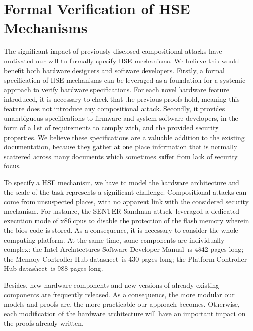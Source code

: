 \section{Formal Verification of HSE Mechanisms}
\label{sec:intro:verif}

The significant impact of previously disclosed compositional attacks have
motivated our will to formally specify HSE mechanisms.
%
We believe this would benefit both hardware designers and software developers.
%
Firstly, a formal specification of HSE mechanisms can be leveraged as a
foundation for a systemic approach to verify hardware specifications.
%
For each novel hardware feature introduced, it is necessary to check that the
previous proofs hold, meaning this feature does not introduce any compositional
attack.
%
Secondly, it provides unambiguous specifications to firmware and system software
developers, in the form of a list of requirements to comply with, and the
provided security properties.
%
We believe these specifications are a valuable addition to the existing
documentation, because they gather at one place information that is normally
scattered across many documents which sometimes suffer from lack of security
focus.

To specify a HSE mechanism, we have to model the hardware architecture and the
scale of the task represents a significant challenge.
%
Compositional attacks can come from unsuspected places, with no apparent link
with the considered security mechanism.
%
For instance, the SENTER Sandman attack\,\cite{kovah2015senter} leveraged a
dedicated execution mode of x86 \acp{cpu} to disable the protection of the flash
memory wherein the \ac{bios} code is stored.
%
As a consequence, it is necessary to consider the whole computing platform.
%
At the same time, some components are individually complex:
%
the Intel Architectures Software Developer Manual\,\cite{intel2014manual} is
4842 pages long;
%
the Memory Controller Hub datasheet\,\cite{intel2009mch} is 430 pages long;
%
the Platform Controller Hub datasheet\,\cite{intel2012pch} is 988 pages long.

Besides, new hardware components and new versions of already existing components
are frequently released.
%
As a consequence, the more modular our models and proofs are, the more
practicable our approach becomes.
%
Otherwise, each modification of the hardware architecture will have an important
impact on the proofs already written.

